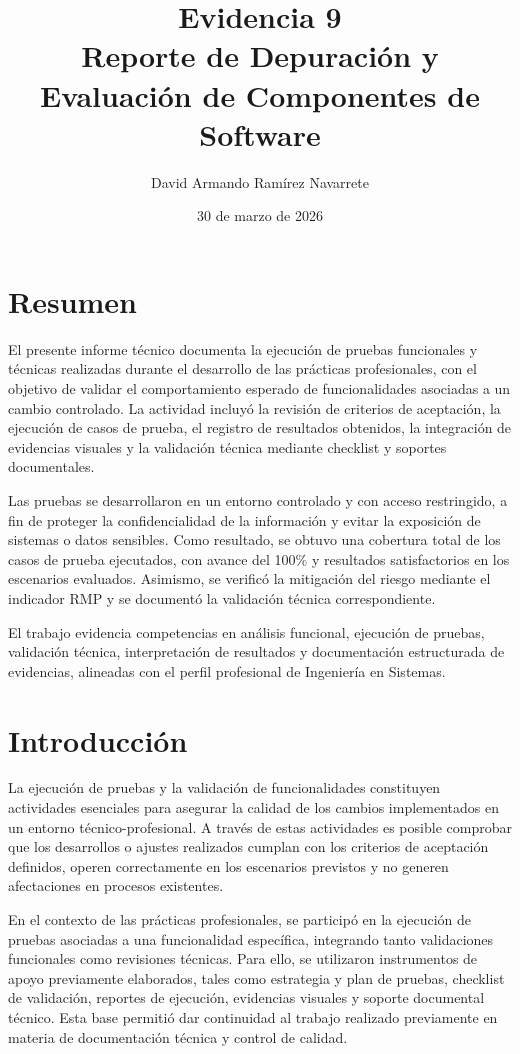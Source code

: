 \documentclass[12pt]{article}
\title{Evidencia 9 \\ Reporte de Depuración y Evaluación de Componentes de Software}
\author{David Armando Ramírez Navarrete}
\date{30 de marzo de 2026}
\begin{document}
\maketitle

\section*{Resumen}
El presente informe técnico documenta la ejecución de pruebas funcionales y técnicas realizadas durante el desarrollo de las prácticas profesionales, con el objetivo de validar el comportamiento esperado de funcionalidades asociadas a un cambio controlado. La actividad incluyó la revisión de criterios de aceptación, la ejecución de casos de prueba, el registro de resultados obtenidos, la integración de evidencias visuales y la validación técnica mediante checklist y soportes documentales.

Las pruebas se desarrollaron en un entorno controlado y con acceso restringido, a fin de proteger la confidencialidad de la información y evitar la exposición de sistemas o datos sensibles. Como resultado, se obtuvo una cobertura total de los casos de prueba ejecutados, con avance del 100\% y resultados satisfactorios en los escenarios evaluados. Asimismo, se verificó la mitigación del riesgo mediante el indicador RMP y se documentó la validación técnica correspondiente.

El trabajo evidencia competencias en análisis funcional, ejecución de pruebas, validación técnica, interpretación de resultados y documentación estructurada de evidencias, alineadas con el perfil profesional de Ingeniería en Sistemas.

\section*{Introducción}

La ejecución de pruebas y la validación de funcionalidades constituyen actividades esenciales para asegurar la calidad de los cambios implementados en un entorno técnico-profesional. A través de estas actividades es posible comprobar que los desarrollos o ajustes realizados cumplan con los criterios de aceptación definidos, operen correctamente en los escenarios previstos y no generen afectaciones en procesos existentes.

En el contexto de las prácticas profesionales, se participó en la ejecución de pruebas asociadas a una funcionalidad específica, integrando tanto validaciones funcionales como revisiones técnicas. Para ello, se utilizaron instrumentos de apoyo previamente elaborados, tales como estrategia y plan de pruebas, checklist de validación, reportes de ejecución, evidencias visuales y soporte documental técnico. Esta base permitió dar continuidad al trabajo realizado previamente en materia de documentación técnica y control de calidad.
\end{document}

